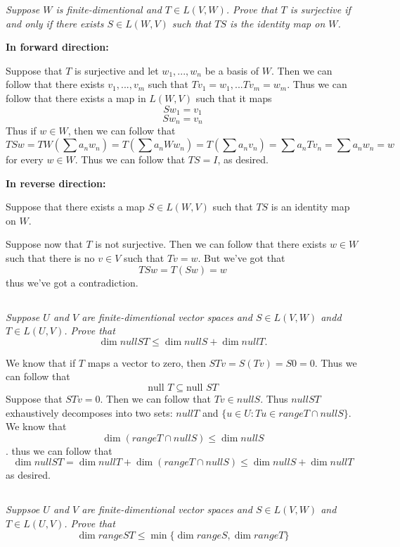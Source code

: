 \documentclass[11pt,oneside,titlepage]{book}
\begin{document}
\textit{Suppose $W$ is finite-dimentional and $T \in L(V, W)$. Prove that $T$ is surjective
  if and only if there exists $S \in L(W, V)$ such that $TS$ is the identity map on $W$.}

\textbf{In forward direction:}

Suppose that $T$ is surjective and let $w_1, ..., w_n$ be a basis of $W$. Then we can follow
that there exists $v_1, ..., v_m$ such that $T v_1 = w_1, ... T v_m = w_m$.
Thus we can follow that there exists a map in $L(W, V)$ such
that it maps
$$S w_1 = v_1$$
$$S w_n = v_n$$
Thus if $w \in W$, then we can follow that
$$TS w = TW(\sum a_n w_n) = T(\sum a_n W  w_n) =  T(\sum a_n v_n) =  \sum a_n T v_n =
\sum a_n w_n = w$$
for every $w \in W$. Thus we can follow that $TS = I$, as desired.

\textbf{In reverse direction:}

Suppose that there exists a map $S \in L(W, V)$ such that $TS$ is an identity map on $W$. 

Suppose now that $T$ is not surjective. Then we can follow that there exists $w \in W$ such that
there is no $v \in V$ such that $Tv = w$. But we've got that
$$TS w = T(Sw) = w$$
thus we've got a contradiction.

\subsection{}

\textit{Suppose $U$ and $V$ are finite-dimentional vector spaces and $S \in L(V, W)$ andd
  $T \in L(U, V)$. Prove that }
$$\dim null ST \leq \dim null S + \dim null T.$$

We know that if $T$ maps a vector to zero, then $STv = S(Tv) = S0 = 0$. Thus we can follow that
$$\text{null } T \subseteq \text{null } ST$$
Suppose that $STv = 0$. Then we can follow that $Tv \in null S$. Thus $ null ST $ exhaustively
decomposes into two sets: $null T$ and $\{u \in U : Tu \in range T \cap null S\}$. We know that
$$\dim (range T \cap null S) \leq \dim null S$$.
thus we can follow that
$$\dim null ST = \dim null T + \dim (range T \cap null S) \leq   \dim null S + \dim null T$$
as desired.

\subsection{}

\textit{Suppsoe $U$ and $V$ are finite-dimentional vector spaces and $S \in L(V, W)$ and
  $T \in L(U, V)$. Prove that}
$$\dim range ST \leq \min\{\dim range S, \dim range T\}$$
\end{document}
